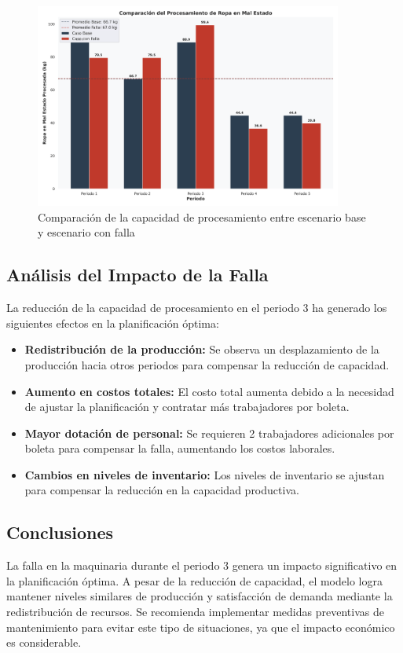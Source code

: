 \begin{figure}[H]
    \centering
    \includegraphics[width=0.9\textwidth]{resources/pregunta3/grafico_comparativo_procesamiento.png}
    \caption{Comparación de la capacidad de procesamiento entre escenario base y escenario con falla}
    \label{fig:comparativa_procesamiento}
\end{figure}

\subsection*{Análisis del Impacto de la Falla}

La reducción de la capacidad de procesamiento en el periodo 3 ha generado los siguientes efectos en la planificación óptima:

\begin{itemize}
    \item \textbf{Redistribución de la producción:} Se observa un desplazamiento de la producción hacia otros periodos para compensar la reducción de capacidad.
    \item \textbf{Aumento en costos totales:} El costo total aumenta debido a la necesidad de ajustar la planificación y contratar más trabajadores por boleta.
    \item \textbf{Mayor dotación de personal:} Se requieren 2 trabajadores adicionales por boleta para compensar la falla, aumentando los costos laborales.
    \item \textbf{Cambios en niveles de inventario:} Los niveles de inventario se ajustan para compensar la reducción en la capacidad productiva.
\end{itemize}

\subsection*{Conclusiones}

La falla en la maquinaria durante el periodo 3 genera un impacto significativo en la planificación óptima. A pesar de la reducción de capacidad, el modelo logra mantener niveles similares de producción y satisfacción de demanda mediante la redistribución de recursos. Se recomienda implementar medidas preventivas de mantenimiento para evitar este tipo de situaciones, ya que el impacto económico es considerable.
